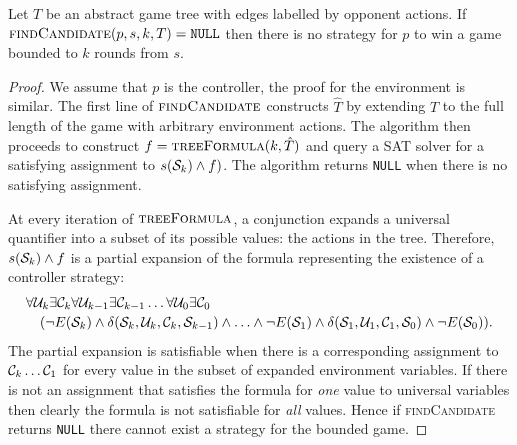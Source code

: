 \begin{proposition}\label{prop:findcandidate}
    Let $T$ be an abstract game tree with edges labelled by opponent actions. If $\textsc{findCandidate}(p, s, k, T) = \texttt{NULL}$ then there is no strategy for $p$ to win a game bounded to $k$ rounds from $s$.
\end{proposition}
\begin{proof}
    We assume that $p$ is the controller, the proof for the environment is similar. The first line of $\textsc{findCandidate}$ constructs $\hat{T}$ by extending $T$ to the full length of the game with arbitrary environment actions. The algorithm then proceeds to construct $f = \textsc{treeFormula}(k, \hat{T})$ and query a SAT solver for a satisfying assignment to $s(\mathcal{S}_k) \land f)$. The algorithm returns \texttt{NULL} when there is no satisfying assignment.


    At every iteration of $\textsc{treeFormula}$, a conjunction expands a universal quantifier into a subset of its possible values: the actions in the tree. Therefore, $s(\mathcal{S}_k) \land f$ is a partial expansion of the formula representing the existence of a controller strategy:
    \begin{equation*}
    \begin{multlined}
        \forall \cU_k \exists \cC_k \forall \cU_{k-1} \exists \cC_{k-1} \ldots \forall \cU_0 \exists \cC_0 \\
        (\lnot E(\cS_k) \land \delta(\cS_k, \cU_k, \cC_k, \cS_{k-1}) \land \ldots \land \lnot E(\cS_1) \land \delta(\cS_1, \cU_1, \cC_1, \cS_0) \land \lnot E(\cS_0)).
    \end{multlined}
    \end{equation*}
    The partial expansion is satisfiable when there is a corresponding assignment to $\mathcal{C}_k \dots \mathcal{C}_1$ for every value in the subset of expanded environment variables.  If there is not an assignment that satisfies the formula for \emph{one} value to universal variables then clearly the formula is not satisfiable for \emph{all} values.  Hence if \textsc{findCandidate} returns \texttt{NULL} there cannot exist a strategy for the bounded game.
\end{proof}

